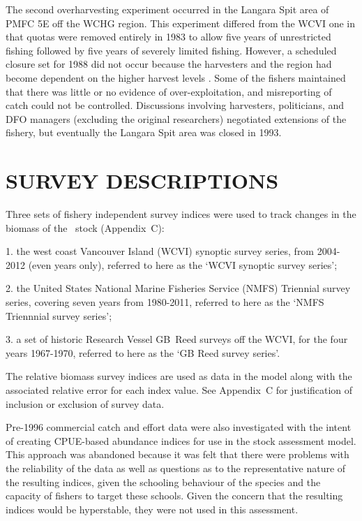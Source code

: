The second overharvesting experiment occurred in the Langara Spit area of PMFC 5E off the WCHG region. This experiment differed from the WCVI one in that quotas were removed entirely in 1983 to allow five years of unrestricted fishing followed by five years of severely limited fishing. However, a scheduled closure set for 1988 did not occur because the harvesters and the region had become dependent on the higher harvest levels \citep{leam98}. Some of the fishers maintained that there was little or no evidence of over-exploitation, and misreporting of catch could not be controlled. Discussions involving harvesters, politicians, and DFO managers (excluding the original researchers) negotiated extensions of the fishery, but eventually the Langara Spit area was closed in 1993.

\section{SURVEY DESCRIPTIONS}

Three sets of fishery independent survey indices were used to track changes in the biomass of the \area~stock (Appendix~C):

1. the west coast Vancouver Island (WCVI) synoptic survey series, from 2004-2012 (even years only), referred to here as the `WCVI synoptic survey series';

2. the United States National Marine Fisheries Service (NMFS) Triennial survey series, covering seven years from 1980-2011, referred to here as the `NMFS Triennnial survey series';

3. a set of historic Research Vessel GB~Reed surveys off the WCVI, for the four years 1967-1970, referred to here as the `GB Reed survey series'.

The relative biomass survey indices are used as data in the model along with the associated relative error for each index value. See Appendix~C for justification of inclusion or exclusion of survey data.

Pre-1996 commercial catch and effort data were also investigated with the intent of creating CPUE-based abundance indices for use in the stock assessment model.  This approach was abandoned because it was felt that there were problems with the reliability of the data as well as questions as to the representative nature of the resulting indices, given the schooling behaviour of the species and the capacity of fishers to target these schools. Given the concern that the resulting indices would be hyperstable, they were not used in this assessment.


